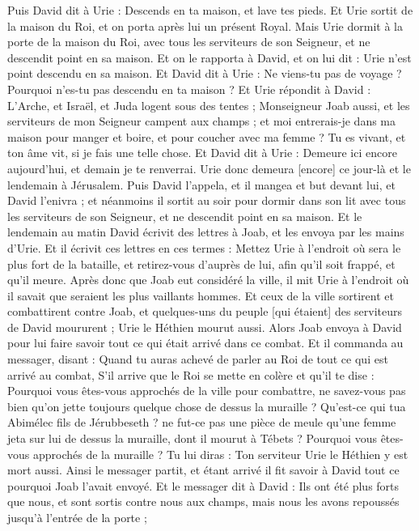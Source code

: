 \begin{multicols}{2}
Puis David dit à Urie : Descends en ta maison, et lave tes pieds. Et Urie sortit de la maison du Roi, et on porta après lui un présent Royal.
Mais Urie dormit à la porte de la maison du Roi, avec tous les serviteurs de son Seigneur, et ne descendit point en sa maison.
Et on le rapporta à David, et on lui dit : Urie n'est point descendu en sa maison. Et David dit à Urie : Ne viens-tu pas de voyage ? Pourquoi n'es-tu pas descendu en ta maison ?
Et Urie répondit à David : L'Arche, et Israël, et Juda logent sous des tentes ; Monseigneur Joab aussi, et les serviteurs de mon Seigneur campent aux champs ; et moi entrerais-je dans ma maison pour manger et boire, et pour coucher avec ma femme ? Tu es vivant, et ton âme vit, si je fais une telle chose.
Et David dit à Urie : Demeure ici encore aujourd'hui, et demain je te renverrai. Urie donc demeura [encore] ce jour-là et le lendemain à Jérusalem.
Puis David l'appela, et il mangea et but devant lui, et David l'enivra ; et néanmoins il sortit au soir pour dormir dans son lit avec tous les serviteurs de son Seigneur, et ne descendit point en sa maison.
Et le lendemain au matin David écrivit des lettres à Joab, et les envoya par les mains d'Urie.
Et il écrivit ces lettres en ces termes : Mettez Urie à l'endroit où sera le plus fort de la bataille, et retirez-vous d'auprès de lui, afin qu'il soit frappé, et qu'il meure.
Après donc que Joab eut considéré la ville, il mit Urie à l'endroit où il savait que seraient les plus vaillants hommes.
Et ceux de la ville sortirent et combattirent contre Joab, et quelques-uns du peuple [qui étaient] des serviteurs de David moururent ; Urie le Héthien mourut aussi.
Alors Joab envoya à David pour lui faire savoir tout ce qui était arrivé dans ce combat.
Et il commanda au messager, disant : Quand tu auras achevé de parler au Roi de tout ce qui est arrivé au combat,
S'il arrive que le Roi se mette en colère et qu'il te dise : Pourquoi vous êtes-vous approchés de la ville pour combattre, ne savez-vous pas bien qu'on jette toujours quelque chose de dessus la muraille ?
Qu'est-ce qui tua Abimélec fils de Jérubbeseth ? ne fut-ce pas une pièce de meule qu'une femme jeta sur lui de dessus la muraille, dont il mourut à Tébets ? Pourquoi vous êtes-vous approchés de la muraille ? Tu lui diras : Ton serviteur Urie le Héthien y est mort aussi.
Ainsi le messager partit, et étant arrivé il fit savoir à David tout ce pourquoi Joab l'avait envoyé.
Et le messager dit à David : Ils ont été plus forts que nous, et sont sortis contre nous aux champs, mais nous les avons repoussés jusqu'à l'entrée de la porte ;

\end{multicols}
